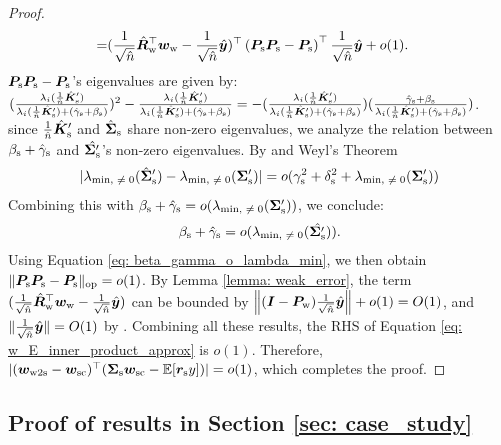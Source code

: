 \begin{proof}
\begin{align}
    \label{eq: w_E_inner_product_approx}
    = & (\frac{1}{\sqrt{\hat{n}}}  \hat{{\bm{R}}}_{\text{w}}^\top {\bm{w}}_{\text{w}} - \frac{1}{\sqrt{\hat{n}}} \hat{{\bm{y}}} )^\top \left(  {\bm{P}}_{\text{s}}{\bm{P}}_{\text{s}} -{\bm{P}}_{\text{s}}  \right)^\top \frac{1}{\sqrt{\hat{n}}}\hat{{\bm{y}}}+ o(1).
\end{align}
${\bm{P}}_{\text{s}}{\bm{P}}_{\text{s}} -{\bm{P}}_{\text{s}}$'s eigenvalues are given by:  $ (\frac{\lambda_i( \frac{1}{\hat{n}}\hat{{\bm{K}}}_{\text{s}}' )}{\lambda_i( \frac{1}{\hat{n}}\hat{{\bm{K}}}_{\text{s}}' ) +(\hat{\gamma}_{\text{s}}+\beta_{\text{s}}) } )^2 - \frac{\lambda_i( \frac{1}{\hat{n}}\hat{{\bm{K}}}_{\text{s}}' )}{\lambda_i( \frac{1}{\hat{n}}\hat{{\bm{K}}}_{\text{s}}' ) +(\hat{\gamma}_{\text{s}}+\beta_{\text{s}}) } = -(\frac{\lambda_i( \frac{1}{\hat{n}}\hat{{\bm{K}}}_{\text{s}}' )}{\lambda_i( \frac{1}{\hat{n}}\hat{{\bm{K}}}_{\text{s}}' ) +(\hat{\gamma}_{\text{s}}+\beta_{\text{s}}) } )(\frac{\hat{\gamma}_{\text{s}}+\beta_{\text{s}}}{\lambda_i( \frac{1}{\hat{n}}\hat{{\bm{K}}}_{\text{s}}' ) +(\hat{\gamma}_{\text{s}}+\beta_{\text{s}}) } ) $. since $\frac{1}{\hat{n}}\hat{{\bm{K}}}_{\text{s}}'$ and $\hat{{\bm{\Sigma}}}_{\text{s}}$ share non-zero eigenvalues,  we analyze the relation between $\beta_{\text{s}}+\hat{\gamma}_{\text{s}}$ and $\hat{{\bm{\Sigma}}_{\text{s}}'}$'s non-zero eigenvalues.  
By \conc{} and Weyl's Theorem
\begin{align}
    \nonumber
    | \lambda_{\text{min, $\neq 0$}}(\hat{{\bm{\Sigma}}}_{\text{s}}') -\lambda_{\text{min, $\neq 0$}}({\bm{\Sigma}}_{\text{s}}') | = o( \gamma_{\text{s}}^2 +\delta_{\text{s}}^2+\lambda_{\text{min, $\neq 0$}}({\bm{\Sigma}}_{\text{s}}'))
\end{align}
Combining this with $\beta_{\text{s}}+\hat{\gamma}_{\text{s}}=o(\lambda_{\text{min, $\neq 0$}}({\bm{\Sigma}}_{\text{s}}'))$, we conclude: 
\begin{align}
\label{eq: beta_gamma_o_lambda_min}
\beta_{\text{s}}+\hat{\gamma}_{\text{s}}=o(\lambda_{\text{min, $\neq 0$}}(\hat{{\bm{\Sigma}}_{\text{s}}'})).
\end{align}
Using Equation \ref{eq: beta_gamma_o_lambda_min}, we then obtain $\lVert {\bm{P}}_{\text{s}}{\bm{P}}_{\text{s}} -{\bm{P}}_{\text{s}} \rVert_{\mathrm{op}}=o(1)$. By Lemma \ref{lemma: weak_error}, the term $ (\frac{1}{\sqrt{\hat{n}}}  \hat{{\bm{R}}}_{\text{w}}^\top {\bm{w}}_{\text{w}} - \frac{1}{\sqrt{\hat{n}}} \hat{{\bm{y}}} )$ can be bounded by $\left\| 
 ({\bm{I}} -{\bm{P}}_{\text{w}} )\frac{1}{\sqrt{\hat{n}}}\hat{{\bm{y}}} \right\|+o(1)=O(1)$, and $\|\frac{1}{\sqrt{\hat{n}}}\hat{{\bm{y}}}\|=O(1)$ by \bounded{}. Combining all these results, the RHS of Equation \ref{eq: w_E_inner_product_approx} is $o(1)$. Therefore, $|({\bm{w}}_{\text{w2s}}- {\bm{w}}_{\text{sc}})^\top  ( {\bm{\Sigma}}_{\text{s}} {\bm{w}}_{\text{sc}} - \mathbb{E}[{\bm{r}}_{\text{s}} y] ) |=o(1)$, which completes the proof.
\end{proof}

\subsection{Proof of results in Section \ref{sec: case_study}}


